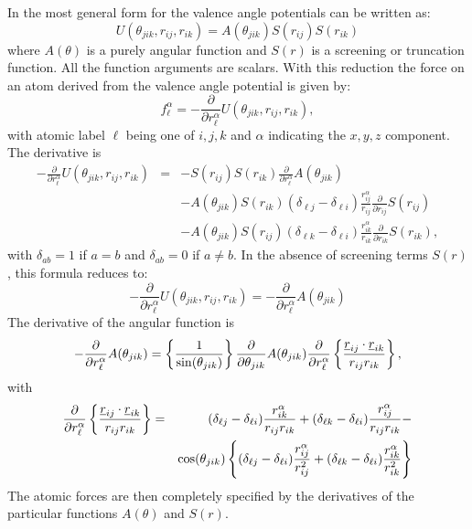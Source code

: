 In \D{} the most general form for the valence
angle
potentials can be written as:
\begin{equation}
U(\theta_{jik},r_{ij},r_{ik})=A(\theta_{jik})S(r_{ij})S(r_{ik})
\end{equation}
where $A(\theta)$ is a purely angular function and $S(r)$ is a
screening or truncation function. All the function arguments are
scalars.  With this reduction the force on an atom derived from the
valence angle potential is given by:
\begin{equation}
f_{\ell}^{\alpha}=-\frac{\partial}{\partial
r_{\ell}^{\alpha}}U(\theta_{jik},r_{ij},r_{ik}),
\end{equation}
with atomic label $\ell$ being one of $i,j,k$ and $\alpha$ indicating the
$x,y,z$ component. The derivative is
\begin{eqnarray}
-\frac{\partial}{\partial
r_{\ell}^{\alpha}}U(\theta_{jik},r_{ij},r_{ik})&=&
-S(r_{ij})S(r_{ik})\frac{\partial}{\partial
r_{\ell}^{\alpha}}A(\theta_{jik}) \nonumber \\ & & -
A(\theta_{jik})S(r_{ik})(\delta_{\ell j}-\delta_{\ell i})
\frac{r_{ij}^{\alpha}}{r_{ij}}
\frac{\partial}{\partial r_{ij}}S(r_{ij})\nonumber \\
& & - A(\theta_{jik})S(r_{ij})(\delta_{\ell k}-\delta_{\ell i})
\frac{r_{ik}^{\alpha}}{r_{ik}}
\frac{\partial}{\partial r_{ik}}S(r_{ik}),
\end{eqnarray}
with $\delta_{ab}=1$ if $a=b$ and $\delta_{ab}=0$ if $a\ne b$. In the
absence of screening terms $S(r)$, this formula reduces to:
\begin{equation}
-\frac{\partial}{\partial
r_{\ell}^{\alpha}}U(\theta_{jik},r_{ij},r_{ik})=
-\frac{\partial}{\partial r_{\ell}^{\alpha}}A(\theta_{jik})
\end{equation}
The derivative of the angular function is
\begin{equation}
-\frac{\partial}{\partial r_{\ell}^{\alpha}}A(\theta_{jik})=
\left\{\frac{1}{\sin(\theta_{jik})}\right\}
\frac{\partial}{\partial \theta_{jik}}A(\theta_{jik})
\frac{\partial}{\partial r_{\ell}^{\alpha}}\left\{
\frac{\mbox{$\underline{r}$}_{ij}\cdot\mbox{$\underline{r}$}_{ik}}{r_{ij}r_{ik}}\right\},
\end{equation}
with
\begin{eqnarray}
\frac{\partial}{\partial r_{\ell}^{\alpha}}\left\{
\frac{\mbox{$\underline{r}$}_{ij}\cdot\mbox{$\underline{r}$}_{ik}}{r_{ij}r_{ik}}\right\}&=&
(\delta_{\ell j}-\delta_{\ell i})\frac{r_{ik}^{\alpha}}{r_{ij}r_{ik}}+
(\delta_{\ell k}-\delta_{\ell
i})\frac{r_{ij}^{\alpha}}{r_{ij}r_{ik}}-\nonumber \\ & &
\cos(\theta_{jik})
\left\{(\delta_{\ell j}-\delta_{\ell
i})\frac{r_{ij}^{\alpha}}{r_{ij}^{2}}+
(\delta_{\ell k}-\delta_{\ell
i})\frac{r_{ik}^{\alpha}}{r_{ik}^{2}}\right\}
\end{eqnarray}
The atomic forces are then completely specified by the derivatives of
the particular functions $A(\theta)$ and $S(r)$.

